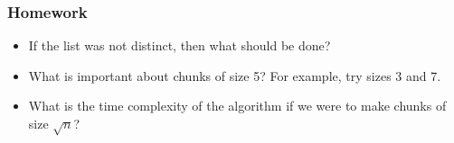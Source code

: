 \begin{frame}
    \frametitle{Homework}

    \begin{itemize}
        \item If the list was not distinct, then what should be done? \vspace{0.4cm}
        \item What is important about chunks of size 5? For example, try sizes 3 and 7. \vspace{0.4cm}
        \item What is the time complexity of the algorithm if we were to make chunks of size $\sqrt{n}$?
    \end{itemize}

\end{frame}
